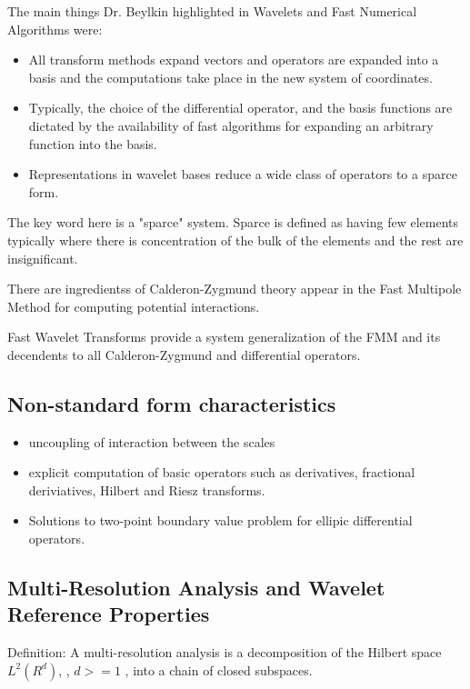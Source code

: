 \documentclass{article}
\begin{document}
The main things Dr. Beylkin highlighted in Wavelets and Fast Numerical
Algorithms were:
\begin{itemize}
\item All transform methods expand vectors and operators are expanded into a
basis and the computations take place in the new system of coordinates.
\item Typically, the choice of the differential operator, and the basis
functions are dictated by the availability of fast algorithms for expanding an
arbitrary function into the basis.
\item Representations in wavelet bases reduce a wide class of operators to a
sparce form.
\end{itemize}

The key word here is a "sparce" system.  Sparce is defined as having few
elements typically where there is concentration of the bulk of the elements and
the rest are insignificant.  

There are ingredientss of Calderon-Zygmund theory appear in the Fast Multipole
Method for computing potential interactions.  

Fast Wavelet Transforms provide a system generalization of the FMM and its
decendents to all Calderon-Zygmund and differential operators.  

\subsection{Non-standard form characteristics}
\begin{itemize}
\item uncoupling of interaction between the scales
\item explicit computation of basic operators such as derivatives, fractional
deriviatives, Hilbert and Riesz transforms.  
\item Solutions to two-point boundary value problem for ellipic differential
operators.  
\end {itemize}

\subsection{Multi-Resolution Analysis and Wavelet Reference Properties}

Definition: A multi-resolution analysis is a decomposition of the Hilbert space
$L^2 (R^d )$, , $d >= 1$ , into a chain of closed subspaces.

\end{document}
